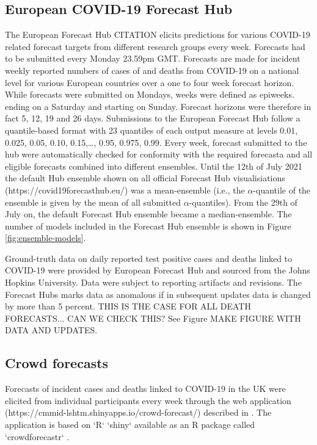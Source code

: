\documentclass[10pt,a4paper,twocolumn]{article}
\begin{document}
\subsection*{European COVID-19 Forecast Hub}

The European Forecast Hub CITATION elicits predictions for various COVID-19 related forecast targets from different research groups every week. Forecasts had to be submitted every Monday 23.59pm GMT. Forecasts are made for incident weekly reported numbers of cases of and deaths from COVID-19 on a national level for various European countries over a one to four week forecast horizon. While forecasts were submitted on Mondays, weeks were defined as epiweeks. ending on a Saturday and starting on Sunday. Forecast horizons were therefore in fact 5, 12, 19 and 26 days. Submissions to the European Forecast Hub follow a quantile-based format with 23 quantiles of each output measure at levels 0.01, 0.025, 0.05, 0.10, 0.15,…, 0.95, 0.975, 0.99.
Every week, forecast submitted to the hub were automatically checked for conformity with the required forecasta and all eligible forecasts combined into different ensembles. Until the 12th of July 2021 the default Hub ensemble shown on all official Forecast Hub visualisiations (https://covid19forecasthub.eu/) was a mean-ensemble (i.e., the $\alpha$-quantile of the ensemble is given by the mean of all submitted $\alpha$-quantiles). From the 29th of July on, the default Forecast Hub ensemble became a median-ensemble. The number of models included in the Forecast Hub ensemble is shown in Figure \ref{fig:ensemble-models}. 

Ground-truth data on daily reported test positive cases and deaths linked to COVID-19 were provided by European Forecast Hub and sourced from the Johns Hopkins University. Data were subject to reporting artifacts and revisions. The Forecast Hubs marks data as anomalous if in subsequent updates data is changed by more than 5 percent. THIS IS THE CASE FOR ALL DEATH FORECASTS... CAN WE CHECK THIS? 
See Figure MAKE FIGURE WITH DATA AND UPDATES. 

\subsection*{Crowd forecasts}

Forecasts of incident cases and deaths linked to COVID-19 in the UK were elicited from individual participants every week through the web application (https://cmmid-lshtm.shinyapps.io/crowd-forecast/) described in \cite{bosseComparingHumanModelbased2022}. The application is based on `R` `shiny` available as an R package called `crowdforecastr` \citep{crowdforecastr}. 
\end{document}
